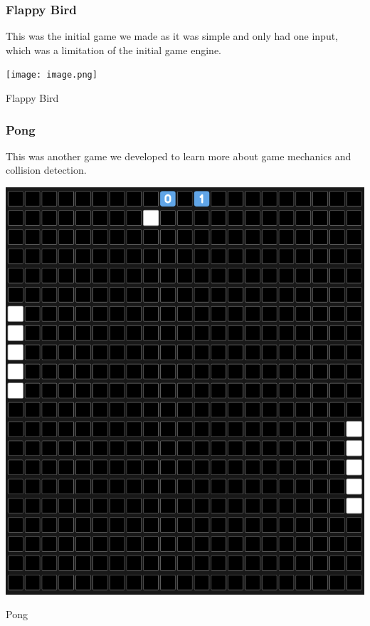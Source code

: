 \documentclass{article}
\begin{document}
\begin{multicols}{2}

\subsubsection{Flappy Bird}
This was the initial game we made as it was simple and only had one input, which was a limitation of the initial game engine.\\

\begin{minipage}{\linewidth}
    \centering
    \texttt{[image: image.png]}
    \captionsetup{type=figure}
    \caption{Flappy Bird}
    \label{fig:game-engine-example}
\end{minipage}

\subsubsection{Pong}
This was another game we developed to learn more about game mechanics and collision detection.\\

\begin{minipage}{\linewidth}
    \centering
    \includegraphics[width=0.8\linewidth]{pong.png}
    \captionsetup{type=figure}
    \caption{Pong}
    \label{fig:enter-label}
\end{minipage}

\end{multicols}
\end{document}

